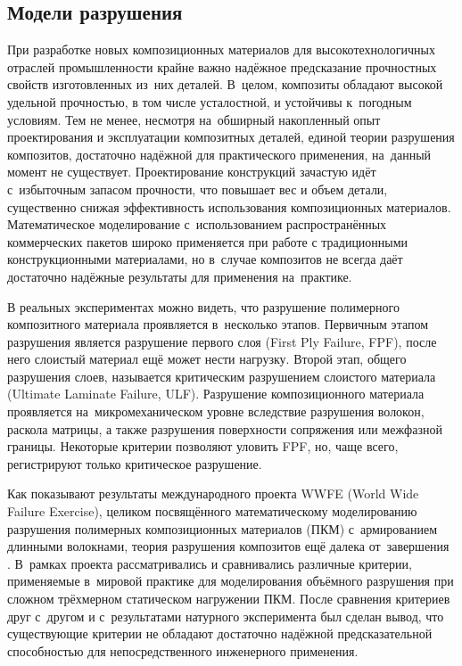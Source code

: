 \documentclass[thesis.tex]{subfiles}
\begin{document}
\subsection{Модели разрушения}
При разработке новых композиционных материалов для высокотехнологичных отраслей промышленности крайне важно надёжное
предсказание прочностных свойств изготовленных из~них деталей. В~целом, композиты обладают высокой удельной прочностью,
в том числе усталостной, и устойчивы к~погодным условиям. Тем не менее, несмотря на~обширный накопленный опыт
проектирования и эксплуатации композитных деталей, единой теории разрушения композитов, достаточно надёжной для
практического применения, на~данный момент не существует. Проектирование конструкций зачастую идёт с~избыточным запасом
прочности, что повышает вес и объем детали, существенно снижая эффективность использования композиционных материалов.
Математическое моделирование с~использованием распространённых коммерческих пакетов широко применяется при работе с
традиционными конструкционными материалами, но в~случае композитов не всегда даёт достаточно надёжные результаты для
применения на~практике.

В реальных экспериментах можно видеть, что разрушение полимерного композитного материала проявляется в~несколько этапов.
Первичным этапом разрушения является разрушение первого слоя (First Ply Failure, FPF), после него слоистый материал ещё
может нести нагрузку. Второй этап, общего разрушения слоев, называется критическим разрушением слоистого материала
(Ultimate Laminate Failure, ULF). Разрушение композиционного материала проявляется на~микромеханическом уровне вследствие
разрушения волокон, раскола матрицы, а также разрушения поверхности сопряжения или межфазной границы. Некоторые критерии
позволяют уловить FPF, но, чаще всего, регистрируют только критическое разрушение.

Как показывают результаты международного проекта WWFE (World Wide Failure Exercise), целиком посвящённого
математическому моделированию разрушения полимерных композиционных материалов (ПКМ) с~армированием длинными волокнами,
теория разрушения композитов ещё далека от~завершения \cite{hinton2004failure,kaddour2013maturity}. В~рамках проекта
рассматривались и сравнивались различные критерии, применяемые в~мировой практике для моделирования объёмного разрушения
при сложном трёхмерном статическом нагружении ПКМ. После сравнения критериев друг с~другом и с~результатами натурного
эксперимента был сделан вывод, что существующие критерии не обладают достаточно надёжной предсказательной способностью
для непосредственного инженерного применения.
\end{document}
